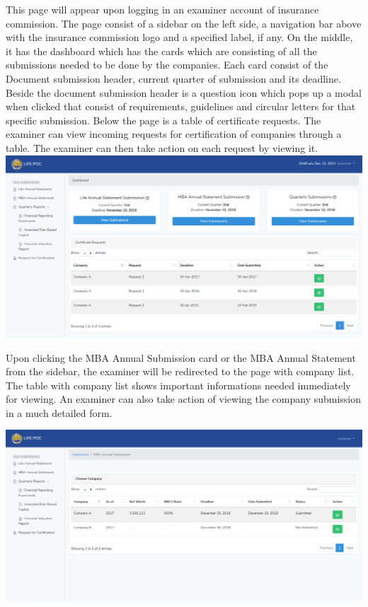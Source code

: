 \documentclass{article}
\begin{document}
This page will appear upon logging in an examiner account of
insurance commission. The page consist of a sidebar on the left side, a
navigation bar above with the insurance commission logo and a specified
label, if any. On the middle, it has the dashboard which has the cards
which are consisting of all the submissions needed to be done by the
companies. Each card consist of the Document submission header, current
quarter of submission and its deadline. Beside the document submission
header is a question icon which pops up a modal when clicked that
consist of requirements, guidelines and circular letters for that
specific submission. Below the page is a table of certificate requests.
The examiner can view incoming requests for certification of companies
through a table. The examiner can then take action on each request by
viewing it.\includegraphics[keepaspectratio=true]{up-ic-screens/image47}{}%

\mdhr{}%

\noindent{}Upon clicking the MBA Annual Submission card or the MBA
Annual Statement from the sidebar, the examiner will be redirected to
the page with company list. The table with company list shows important
informations needed immediately for viewing. An examiner can also take
action of viewing the company submission in a much detailed form.%

\includegraphics[keepaspectratio=true]{up-ic-screens/image120}{}%
\end{document}
